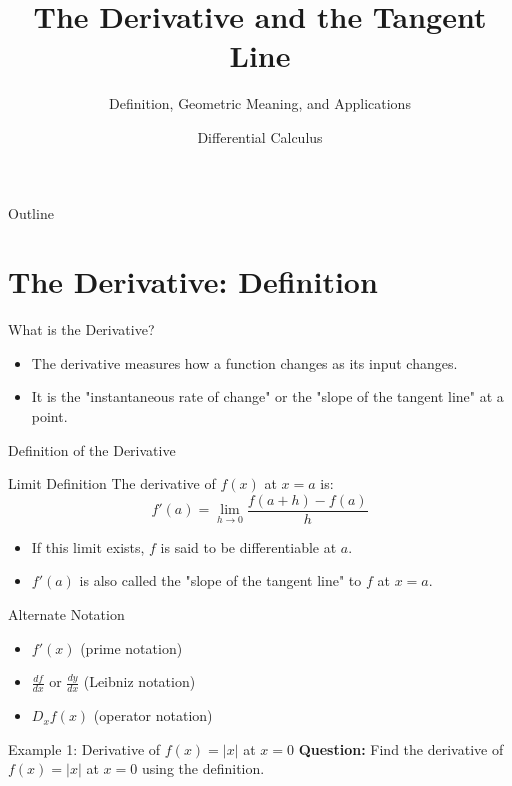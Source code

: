 \documentclass[aspectratio=169]{beamer}
\title{The Derivative and the Tangent Line}
\subtitle{Definition, Geometric Meaning, and Applications}
\author{Differential Calculus}
\date{}
\begin{document}
\begin{frame}
\titlepage
\end{frame}

\begin{frame}{Outline}
\tableofcontents
\end{frame}

\section{The Derivative: Definition}

\begin{frame}{What is the Derivative?}
\begin{itemize}
  \item The derivative measures how a function changes as its input changes.
  \item It is the "instantaneous rate of change" or the "slope of the tangent line" at a point.
\end{itemize}
\end{frame}

\begin{frame}{Definition of the Derivative}
\begin{block}{Limit Definition}
The derivative of $f(x)$ at $x=a$ is:
\[
  f'(a) = \lim_{h \to 0} \frac{f(a+h) - f(a)}{h}
\]
\end{block}
\begin{itemize}
  \item If this limit exists, $f$ is said to be differentiable at $a$.
  \item $f'(a)$ is also called the "slope of the tangent line" to $f$ at $x=a$.
\end{itemize}
\end{frame}

\begin{frame}{Alternate Notation}
\begin{itemize}
  \item $f'(x)$ (prime notation)
  \item $\frac{df}{dx}$ or $\frac{dy}{dx}$ (Leibniz notation)
  \item $D_x f(x)$ (operator notation)
\end{itemize}
\end{frame}

\begin{frame}{Example 1: Derivative of $f(x) = |x|$ at $x=0$}
\textbf{Question:} Find the derivative of $f(x) = |x|$ at $x=0$ using the definition.
\end{frame}
\end{document}
